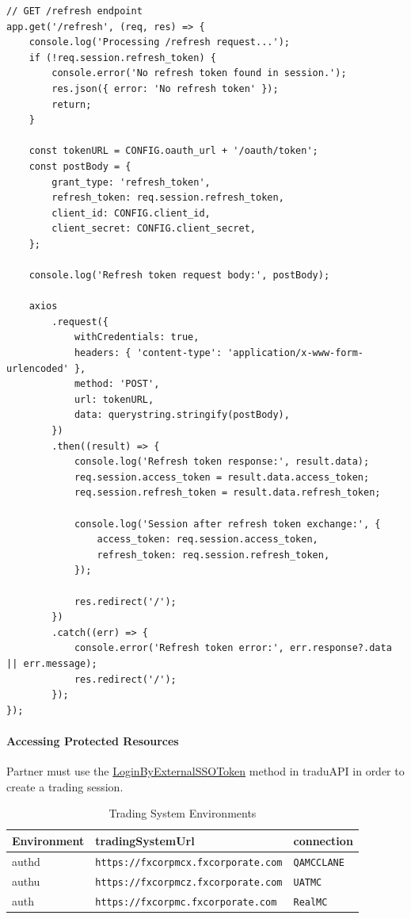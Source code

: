 \documentclass[11pt]{article}
\begin{document}
\begin{codebox}
\begin{verbatim}
// GET /refresh endpoint
app.get('/refresh', (req, res) => {
    console.log('Processing /refresh request...');
    if (!req.session.refresh_token) {
        console.error('No refresh token found in session.');
        res.json({ error: 'No refresh token' });
        return;
    }

    const tokenURL = CONFIG.oauth_url + '/oauth/token';
    const postBody = {
        grant_type: 'refresh_token',
        refresh_token: req.session.refresh_token,
        client_id: CONFIG.client_id,
        client_secret: CONFIG.client_secret,
    };

    console.log('Refresh token request body:', postBody);

    axios
        .request({
            withCredentials: true,
            headers: { 'content-type': 'application/x-www-form-urlencoded' },
            method: 'POST',
            url: tokenURL,
            data: querystring.stringify(postBody),
        })
        .then((result) => {
            console.log('Refresh token response:', result.data);
            req.session.access_token = result.data.access_token;
            req.session.refresh_token = result.data.refresh_token;

            console.log('Session after refresh token exchange:', {
                access_token: req.session.access_token,
                refresh_token: req.session.refresh_token,
            });

            res.redirect('/');
        })
        .catch((err) => {
            console.error('Refresh token error:', err.response?.data || err.message);
            res.redirect('/');
        });
});
\end{verbatim}
\end{codebox}
\paragraph{Accessing Protected Resources}
Partner must use the \href{https://docs.gehtsoftusa.com/tradu_api/core/core/classes/IFXConnectLiteSessionMethods/IFXConnectLiteSession.loginByExternalSsoToken.html}{LoginByExternalSSOToken} method in traduAPI in order to create a trading session.

\begin{table}[h]
    \centering
    \begin{tabular}{l l l}
        \toprule
        Environment & tradingSystemUrl & connection \\
        \midrule
        authd   & \verb|https://fxcorpmcx.fxcorporate.com| & \verb|QAMCCLANE| \\
        authu & \verb|https://fxcorpmcz.fxcorporate.com| & \verb|UATMC| \\
        auth & \verb|https://fxcorpmc.fxcorporate.com|  & \verb|RealMC| \\
        \bottomrule
    \end{tabular}
    \caption{Trading System Environments}
    \label{tab:trading_envs}
\end{table}
\end{document}
